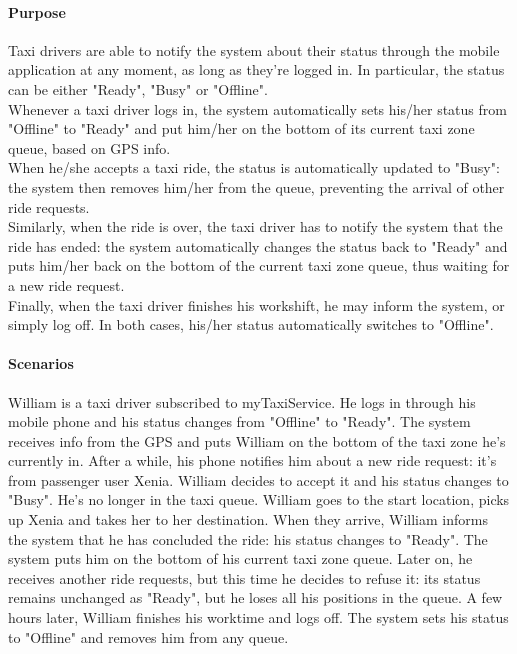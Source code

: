\paragraph{Purpose}
Taxi drivers are able to notify the system about their status through the mobile application at any moment, as long as they're logged in. In particular, the status can be either "Ready", "Busy" or "Offline".\\
Whenever a taxi driver logs in, the system automatically sets his/her status from "Offline" to "Ready" and put him/her on the bottom of its current taxi zone queue, based on GPS info.\\
When he/she accepts a taxi ride, the status is automatically updated to "Busy": the system then removes him/her from the queue, preventing the arrival of other ride requests.\\
Similarly, when the ride is over, the taxi driver has to notify the system that the ride has ended: the system automatically changes the status back to "Ready" and puts him/her back on the bottom of the current taxi zone queue, thus waiting for a new ride request.\\
Finally, when the taxi driver finishes his workshift, he may inform the system, or simply log off. In both cases, his/her status automatically switches to "Offline".

\paragraph{Scenarios}
William is a taxi driver subscribed to myTaxiService. He logs in through his mobile phone and his status changes from "Offline" to "Ready". The system receives info from the GPS and puts William on the bottom of the taxi zone he's currently in. After a while, his phone notifies him about a new ride request: it's from passenger user Xenia. William decides to accept it and his status changes to "Busy". He's no longer in the taxi queue. William goes to the start location, picks up Xenia and takes her to her destination. When they arrive, William informs the system that he has concluded the ride: his status changes to "Ready". The system puts him on the bottom of his current taxi zone queue. Later on, he receives another ride requests, but this time he decides to refuse it: its status remains unchanged as "Ready", but he loses all his positions in the queue. A few hours later, William finishes his worktime and logs off. The system sets his status to "Offline" and removes him from any queue.

